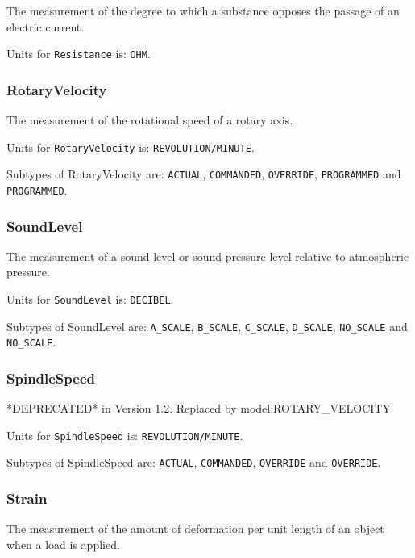 The measurement of the degree to which a substance opposes the passage of an electric current.


Units for \texttt{Resistance} is: \texttt{OHM}.

\FloatBarrier

\subsubsection{RotaryVelocity}
  \label{sec:RotaryVelocity}


The measurement of the rotational speed of a rotary axis.


Units for \texttt{RotaryVelocity} is: \texttt{REVOLUTION/MINUTE}.


Subtypes of RotaryVelocity are: \texttt{ACTUAL}, \texttt{COMMANDED}, \texttt{OVERRIDE}, \texttt{PROGRAMMED} and \texttt{PROGRAMMED}. 
\FloatBarrier

\subsubsection{SoundLevel}
  \label{sec:SoundLevel}


The measurement of a sound level or sound pressure level relative to atmospheric pressure.


Units for \texttt{SoundLevel} is: \texttt{DECIBEL}.


Subtypes of SoundLevel are: \texttt{A_SCALE}, \texttt{B_SCALE}, \texttt{C_SCALE}, \texttt{D_SCALE}, \texttt{NO_SCALE} and \texttt{NO_SCALE}. 
\FloatBarrier

\subsubsection{SpindleSpeed}
  \label{sec:SpindleSpeed}


*DEPRECATED* in Version 1.2.  Replaced by {model:ROTARY_VELOCITY}


Units for \texttt{SpindleSpeed} is: \texttt{REVOLUTION/MINUTE}.


Subtypes of SpindleSpeed are: \texttt{ACTUAL}, \texttt{COMMANDED}, \texttt{OVERRIDE} and \texttt{OVERRIDE}. 
\FloatBarrier

\subsubsection{Strain}
  \label{sec:Strain}


The measurement of the amount of deformation per unit length of an object when a load is applied.


